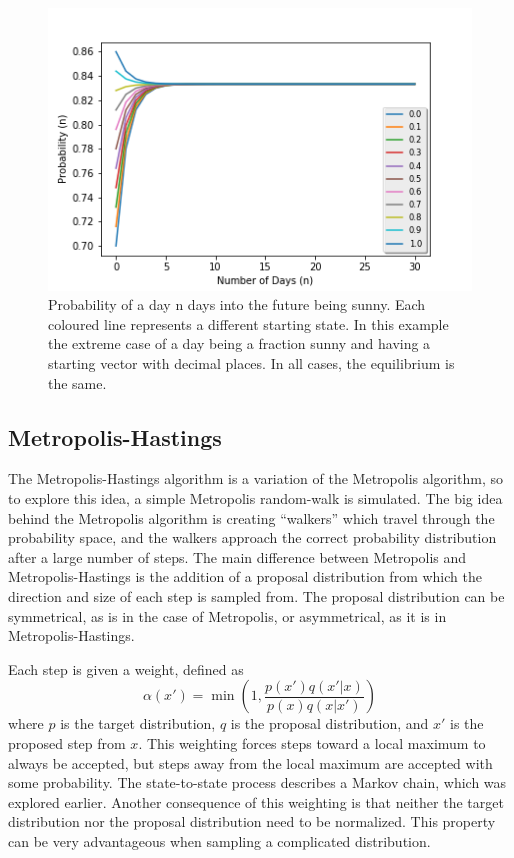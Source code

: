 \documentclass[twocolumn]{article}
\begin{document}
\begin{figure}
\centering
\includegraphics[width=\linewidth]{fig14}
\caption{Probability of a day n days into the future being sunny. Each coloured line represents a different starting state. In this example the extreme case of a day being a fraction sunny and having a starting vector with decimal places. In all cases, the equilibrium is the same.}
\label{fig:fig14}
\end{figure}

\subsection{Metropolis-Hastings}
The Metropolis-Hastings algorithm is a variation of the Metropolis algorithm, so
to explore this idea, a simple Metropolis random-walk is simulated. The big idea
behind the Metropolis algorithm is creating ``walkers'' which travel through the
probability space, and the walkers approach the correct probability distribution
after a large number of steps. The main difference between Metropolis and
Metropolis-Hastings is the addition of a proposal distribution from which the
direction and size of each step is sampled from. The proposal distribution can
be symmetrical, as is in the case of Metropolis, or asymmetrical, as it is in
Metropolis-Hastings.

Each step is given a weight, defined as
\begin{equation}
	\alpha(x') = \min \left( 1, \frac{p(x') q(x' | x)}{p(x) q(x | x')} \right)
	\label{eq:acceptance}
\end{equation}
where $p$ is the target distribution, $q$ is the proposal distribution, and $x'$
is the proposed step from $x$. This weighting forces steps toward a local
maximum to always be accepted, but steps away from the local maximum are
accepted with some probability. The state-to-state process describes a Markov
chain, which was explored earlier. Another consequence of this weighting is that
neither the target distribution nor the proposal distribution need to be
normalized. This property can be very advantageous when sampling a complicated
distribution.
\end{document}
